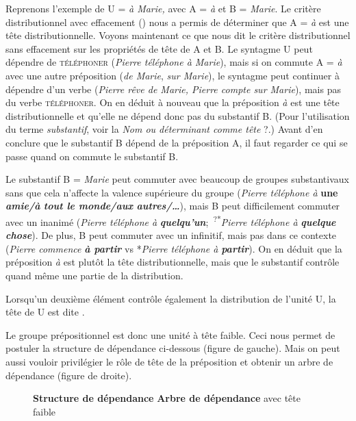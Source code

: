 Reprenons l’exemple de U = \textit{à Marie,} avec A = \textit{à} et B = \textit{Marie}. Le critère distributionnel avec effacement () nous a permis de déterminer que A = \textit{à} est une tête distributionnelle. Voyons maintenant ce que nous dit le critère distributionnel sans effacement sur les propriétés de tête de A et B. Le syntagme U peut dépendre de \textsc{téléphoner} (\textit{Pierre téléphone à Marie}), mais si on commute A = \textit{à} avec une autre préposition (\textit{de Marie}, \textit{sur Marie}), le syntagme peut continuer à dépendre d’un verbe (\textit{Pierre rêve de Marie, Pierre compte sur Marie}), mais pas du verbe \textsc{téléphoner}. On en déduit à nouveau que la préposition \textit{à} est une tête distributionnelle et qu’elle ne dépend donc pas du substantif B. (Pour l’utilisation du terme \textit{substantif}, voir la  \textit{Nom ou déterminant comme tête} ?.) Avant d’en conclure que le substantif B dépend de la préposition A, il faut regarder ce qui se passe quand on commute le substantif B.

Le substantif B = \textit{Marie} peut commuter avec beaucoup de groupes substantivaux sans que cela n’affecte la valence supérieure du groupe (\textit{Pierre téléphone à}\textbf{ \textbf{une} \textit{amie/à} \textit{tout le monde/aux} \textit{autres/…}}), mais B peut difficilement commuter avec un inanimé (\textit{Pierre téléphone à} \textbf{\textit{quelqu’un}};~\textsuperscript{?*}\textit{Pierre téléphone à} \textbf{\textit{quelque chose}}). De plus, B peut commuter avec un infinitif, mais pas dans ce contexte (\textit{Pierre commence} \textbf{\textit{à partir}} vs *\textit{Pierre téléphone à} \textbf{\textit{partir}}). On en déduit que la préposition \textit{à} est plutôt la tête distributionnelle, mais que le substantif contrôle quand même une partie de la distribution.

\begin{styleLivreImportant}
Lorsqu’un deuxième élément contrôle également la distribution de l’unité U, la tête de U est dite .
\end{styleLivreImportant}

Le groupe prépositionnel est donc une unité à tête faible. Ceci nous permet de postuler la structure de dépendance ci-dessous (figure de gauche). Mais on peut aussi vouloir privilégier le rôle de tête de la préposition et obtenir un arbre de dépendance (figure de droite).

\begin{figure}

    \textbf{Structure de dépendance}      \textbf{Arbre de dépendance}
        avec tête faible
    \caption{\label{fig:}}
\end{figure}

